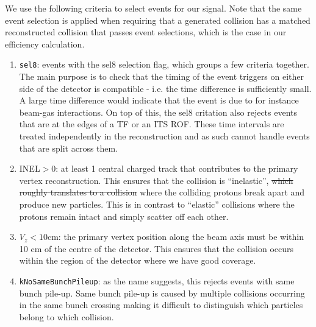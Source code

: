     We use the following criteria to select events for our signal. 
    Note that the same event selection is applied %
    when requiring that a generated collision has a matched reconstructed collision that passes event selections, which is the case in our efficiency calculation.

    \begin{enumerate}
      \item \texttt{sel8}: events with the sel8 selection flag, which groups a few criteria together.  The main purpose is to check that the timing of the event triggers on either side of the detector is compatible - i.e. the time difference is sufficiently small. A large time difference would indicate that the event is due to for instance beam-gas interactions. On top of this, the sel8 critation also rejects events that are at the edges of a TF or an ITS ROF. These time intervals are treated independently in the reconstruction \cite{OverviewO2reconstruction} and as such cannot handle events that are split across them. 
      \item INEL$>0$: at least 1 central charged track that contributes to the primary vertex reconstruction. This ensures that the collision is ``inelastic'', \sout{which roughly translates to a collision} where the colliding protons break apart and produce new particles. This is in contrast to ``elastic'' collisions where the protons remain intact and simply scatter off each other. 
      \item $V_z < 10$cm: the primary vertex position along the beam axis must be within 10 cm of the centre of the detector. This ensures that the collision occurs within the region of the detector where we have good coverage. 
      \item \texttt{kNoSameBunchPileup}: as the name suggests, this rejects events with same bunch pile-up. Same bunch pile-up is caused by multiple collisions occurring in the same bunch crossing making it difficult to distinguish which particles belong to which collision. 
    \end{enumerate}

